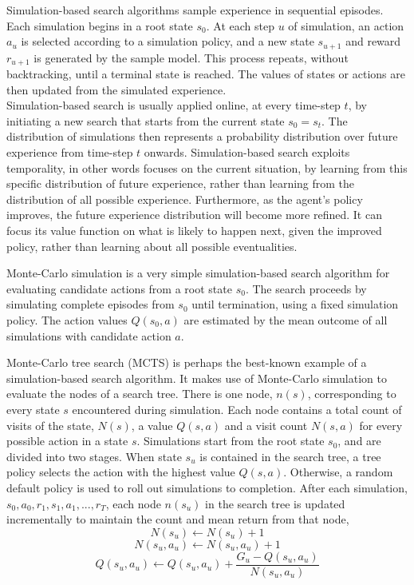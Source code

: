 Simulation-based search algorithms sample experience in sequential episodes. Each simulation begins in a root state $s_0$. At each step $u$ of simulation, an action $a_u$ is selected according to a simulation policy, and a new state $s_{u+1}$ and reward $r_{u+1}$ is generated by the sample model. This process repeats, without backtracking, until a terminal state is reached. The values of states or actions are then updated from the simulated experience. \\ Simulation-based search is usually applied online, at every time-step $t$, by initiating a new search that starts from the current state $s_0 = s_t$. The distribution of simulations then represents a probability distribution over future experience from time-step $t$ onwards. Simulation-based search exploits temporality, in other words focuses on the current situation, by learning from this specific distribution of future experience, rather than learning from the distribution of all possible experience. Furthermore, as the agent’s policy improves, the future experience distribution will become more refined. It can focus its value function on what is likely to happen next, given the improved policy, rather than learning about all possible eventualities.

Monte-Carlo simulation is a very simple simulation-based search algorithm for evaluating candidate actions from a root state $s_0$. The search proceeds by simulating complete episodes from $s_0$ until termination, using a fixed simulation policy. The action values $Q(s_0, a)$ are estimated by the mean outcome of all simulations with candidate action $a$.

Monte-Carlo tree search (MCTS) is perhaps the best-known example of a simulation-based search algorithm. It makes use of Monte-Carlo simulation to evaluate the nodes of a search tree. There is one node, $n(s)$, corresponding to every state $s$ encountered during simulation. Each node contains a total count of visits of the state, $N(s)$, a value $Q(s, a)$ and a visit count $N(s, a)$ for every possible action in a state $s$. Simulations start from the root state $s_0$, and are divided into two stages. When state $s_u$ is contained in the search tree, a tree policy selects the action with the highest value $Q(s, a)$. Otherwise, a random default policy is used to roll out simulations to completion. After each simulation, $s_0, a_0, r_1, s_1, a_1, ..., r_T$, each node $n(s_u)$ in the search tree is updated incrementally to maintain the count and mean return from that node,
$$N(s_u) \leftarrow N(s_u) + 1$$
$$N(s_u, a_u) \leftarrow N(s_u, a_u) + 1$$
$$Q(s_u, a_u) \leftarrow Q(s_u, a_u) + \frac{G_u - Q(s_u, a_u)}{N(s_u, a_u)}$$

